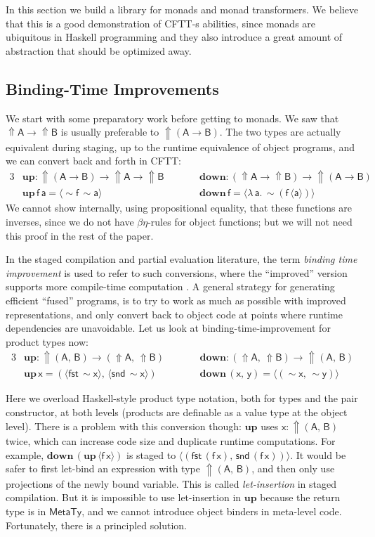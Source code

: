 \documentclass[acmsmall,screen,review,anonymous]{acmart}
\newcommand{\msf}[1]{{\mathsf{#1}}}
\newcommand{\mbf}[1]{{\mathbf{#1}}}
\newcommand{\bs}[1]{\boldsymbol{#1}}
\newcommand{\ind}{\hspace{1em}}
\newcommand{\lam}{\lambda\,}
\newcommand{\vA}{\mathsf{A}}
\newcommand{\vB}{\mathsf{B}}
\newcommand{\va}{\mathsf{a}}
\newcommand{\vx}{\mathsf{x}}
\newcommand{\vy}{\mathsf{y}}
\newcommand{\vf}{\mathsf{f}}
\newcommand{\Up}{{\Uparrow}}
\newcommand{\spl}{{\bs{\sim}}}
\newcommand{\ql}{{\bs{\langle}}}
\newcommand{\qr}{{\bs{\rangle}}}
\newcommand{\MTy}{\msf{MetaTy}}
\newcommand{\fst}{\msf{fst}}
\newcommand{\snd}{\msf{snd}}
\theoremstyle{remark}
\newcommand{\mup}{\mbf{up}}
\newcommand{\mdown}{\mbf{down}}
\newcommand{\qt}[1]{\ql#1\qr}
\begin{document}
In this section we build a library for monads and monad transformers. We believe
that this is a good demonstration of CFTT-s abilities, since monads are
ubiquitous in Haskell programming and they also introduce a great amount of
abstraction that should be optimized away.

\subsection{Binding-Time Improvements}\label{sec:binding-time-improvements}

We start with some preparatory work before getting to monads. We saw that $\Up
\vA \to \Up \vB$ is usually preferable to $\Up(\vA \to \vB)$. The two types are
actually equivalent during staging, up to the runtime equivalence of object programs,
and we can convert back and forth in CFTT:
\begin{alignat*}{3}
  &\mup : \Up (\vA \to \vB) \to \Up \vA \to \Up \vB && \ind\ind \mdown : (\Up \vA \to \Up \vB) \to \Up (\vA \to \vB) \\
  &\mup\,\vf\,\va = \ql \spl \vf\, \spl \va\qr   && \ind\ind \mdown\,\vf = \ql \lam \va.\,\spl(\vf\,\ql \va \qr) \qr
\end{alignat*}
We cannot show internally, using propositional equality, that these functions are
inverses, since we do not have $\beta\eta$-rules for object functions; but we
will not need this proof in the rest of the paper.

In the staged compilation and partial evaluation literature, the term
\emph{binding time improvement} is used to refer to such conversions, where the
``improved'' version supports more compile-time computation
\cite{partial-evaluation}. A general strategy for generating efficient ``fused''
programs, is to try to work as much as possible with improved representations,
and only convert back to object code at points where runtime dependencies are
unavoidable. Let us look at binding-time-improvement for product types now:
\begin{alignat*}{3}
  &\mup : \Up (\vA,\,\vB) \to (\Up \vA,\,\Up \vB) && \ind\ind \mdown : (\Up \vA,\,\Up \vB) \to \Up(\vA,\,\vB) \\
  &\mup\,\vx = (\qt{\fst\,\spl \vx},\, \qt{\snd\,\spl \vx})   && \ind\ind \mdown\,(\vx,\,\vy) = \qt{(\spl \vx,\,\spl \vy)}
\end{alignat*}

Here we overload Haskell-style product type notation, both for types and the
pair constructor, at both levels (products are definable as a value type at the
object level). There is a problem with this conversion though: $\mup$ uses $\vx
: \Up(\vA,\,\vB)$ twice, which can increase code size and duplicate runtime
computations. For example, $\mdown\,({\mup\,\ql \vf\,\vx \qr})$ is staged to
$\ql (\fst\,(\vf\,\vx),\,\snd\,(\vf\,\vx)) \qr$. It would be safer to first
let-bind an expression with type $\Up(\vA,\,\vB)$, and then only use projections
of the newly bound variable. This is called \emph{let-insertion} in staged
compilation. But it is impossible to use let-insertion in $\mup$ because the
return type is in $\MTy$, and we cannot introduce object binders in meta-level
code.  Fortunately, there is a principled solution.
\end{document}
